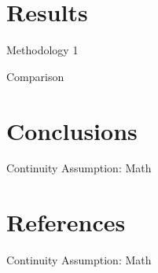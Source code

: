 \documentclass{beamer}
\begin{document}
\section{Results}

\begin{frame}{Methodology 1}

\end{frame}


\begin{frame}{Comparison}

\end{frame}

\section{Conclusions}

\begin{frame}{Continuity Assumption: Math}

\end{frame}



\section{References}

\begin{frame}{Continuity Assumption: Math}

\end{frame}
\end{document}
